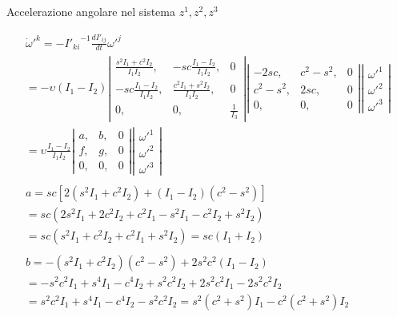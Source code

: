 \documentclass[a4paper,11pt]{article}
\begin{document}
Accelerazione angolare nel sistema $ z^1, z^2, z^3 $

\begin{eqnarray*}
	\dot \omega'^k = - {I'_{ki}}^{-1} \frac{d I'_{ij}}{dt} {\omega'}^j
\\
	= - \upsilon (I_1 - I_2)
	\left|
	\begin{array}{lll}
	\frac{s^2 I_1 + c^2 I_2}{I_1 I_2},	&	-sc \frac{I_1 - I_2}{I_1 I_2},		&	0
	\\
	-sc \frac{I_1 - I_2}{I_1 I_2},		&	\frac{c^2 I_1 + s^2 I_2}{I_1 I_2},	&	0
	\\
	0,							&	0,							&	\frac{1}{I_3}
	\end{array}
	\right|
	\left|
	\begin{array}{lll}
	-2 s c,	&	c^2 - s^2,	&	0
	\\
	c^2 - s^2,	&	2 s c,		&	0
	\\
	0,		&	 0,		&	0
	\end{array}
	\right|
	\left|
	\begin{array}{l}
	{\omega'}^1
	\\
	{\omega'}^2
	\\
	{\omega'}^3
	\end{array}
	\right|
\\
	= \upsilon \frac{I_1 - I_2}{I_1 I_2}
	\left|
	\begin{array}{lll}
	a,	&	b,	&	0
	\\
	f,	&	g,	&	0
	\\
	0,	&	0,	&	0
	\end{array}
	\right|
	\left|
	\begin{array}{l}
	{\omega'}^1
	\\
	{\omega'}^2
	\\
	{\omega'}^3
	\end{array}
	\right|
\\
\\
	a = s c [2 (s^2 I_1 + c^2 I_2) + (I_1 - I_2) (c^2 - s^2)]
\\
	= s c (2 s^2 I_1 + 2 c^2 I_2 + c^2 I_1 - s^2 I_1 - c^2 I_2 + s^2 I_2)
\\
	= s c (s^2 I_1 + c^2 I_2 + c^2 I_1 + s^2 I_2) = s c (I_1 + I_2)
\\
\\
	b = -(s^2 I_1 + c^2 I_2) (c^2 - s^2) + 2 s^2 c^2 (I_1 - I_2)
\\
	= -s^2 c^2 I_1 + s^4 I_1 - c^4 I_2 + s^2 c^2 I_2 + 2 s^2 c^2 I_1 - 2 s^2 c^2 I_2
\\
	= s^2 c^2 I_1 + s^4 I_1 - c^4 I_2 - s^2 c^2 I_2
	= s^2 (c^2 + s^2) I_1 - c^2 (c^2 + s^2) I_2

\end{eqnarray*}
\end{document}

